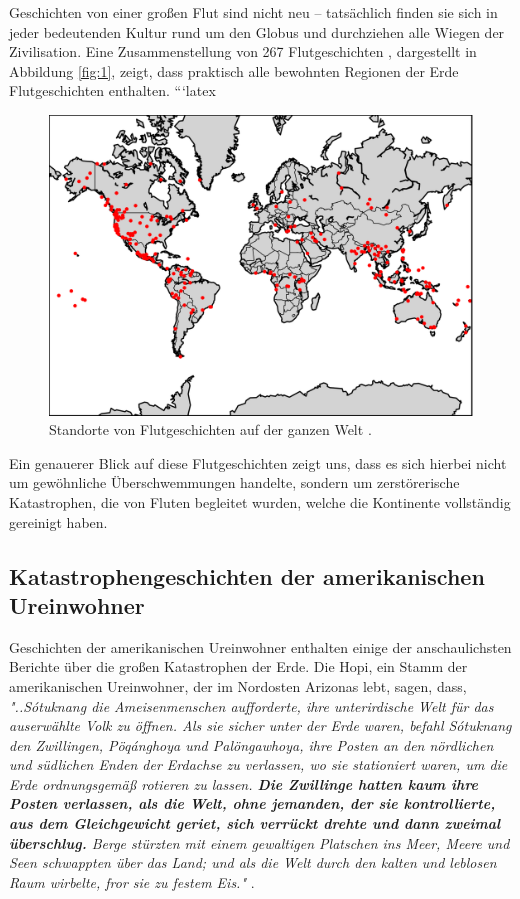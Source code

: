 \documentclass[10pt,twocolumn,letterpaper]{article}
\begin{document}
Geschichten von einer großen Flut sind nicht neu – tatsächlich finden sie sich in jeder bedeutenden Kultur rund um den Globus und durchziehen alle Wiegen der Zivilisation. Eine Zusammenstellung von 267 Flutgeschichten \cite{3}, dargestellt in Abbildung \ref{fig:1}, zeigt, dass praktisch alle bewohnten Regionen der Erde Flutgeschichten enthalten.
```latex
\begin{figure}[h]
\begin{center}
   \includegraphics[width=1\linewidth]{b.png}
\end{center}
   \caption{Standorte von Flutgeschichten auf der ganzen Welt \cite{3}.}
\label{fig:1}
\label{fig:onecol}
\end{figure}

Ein genauerer Blick auf diese Flutgeschichten zeigt uns, dass es sich hierbei nicht um gewöhnliche Überschwemmungen handelte, sondern um zerstörerische Katastrophen, die von Fluten begleitet wurden, welche die Kontinente vollständig gereinigt haben.

\subsection{Katastrophengeschichten der amerikanischen Ureinwohner}

Geschichten der amerikanischen Ureinwohner enthalten einige der anschaulichsten Berichte über die großen Katastrophen der Erde. Die Hopi, ein Stamm der amerikanischen Ureinwohner, der im Nordosten Arizonas lebt, sagen, dass, \textit{"..Sótuknang die Ameisenmenschen aufforderte, ihre unterirdische Welt für das auserwählte Volk zu öffnen. Als sie sicher unter der Erde waren, befahl Sótuknang den Zwillingen, Pöqánghoya und Palöngawhoya, ihre Posten an den nördlichen und südlichen Enden der Erdachse zu verlassen, wo sie stationiert waren, um die Erde ordnungsgemäß rotieren zu lassen. \textbf{Die Zwillinge hatten kaum ihre Posten verlassen, als die Welt, ohne jemanden, der sie kontrollierte, aus dem Gleichgewicht geriet, sich verrückt drehte und dann zweimal überschlug.} Berge stürzten mit einem gewaltigen Platschen ins Meer, Meere und Seen schwappten über das Land; und als die Welt durch den kalten und leblosen Raum wirbelte, fror sie zu festem Eis."} \cite{4}.
\end{document}
